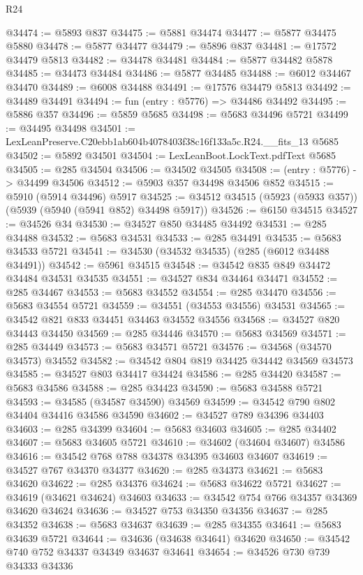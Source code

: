 \begin{lexlean}{R24}
\begin{coremodule}
@34474 := @5893 @837
@34475 := @5881 @34474
@34477 := @5877 @34475 @5880
@34478 := @5877 @34477
@34479 := @5896 @837
@34481 := @17572 @34479 @5813
@34482 := @34478 @34481
@34484 := @5877 @34482 @5878
@34485 := @34473 @34484
@34486 := @5877 @34485
@34488 := @6012 @34467 @34470
@34489 := @6008 @34488
@34491 := @17576 @34479 @5813
@34492 := @34489 @34491
@34494 := fun (entry : @5776) => @34486 @34492
@34495 := @5886 @357
@34496 := @5859 @5685
@34498 := @5683 @34496 @5721
@34499 := @34495 @34498
@34501 := LexLeanPreserve.C20ebb1ab604b4078403f38c16f133a5c.R24.__fits_13 @5685
@34502 := @5892 @34501
@34504 := LexLeanBoot.LockText.pdfText @5685
@34505 := @285 @34504
@34506 := @34502 @34505
@34508 := (entry : @5776) -> @34499 @34506
@34512 := @5903 @357 @34498 @34506 @852
@34515 := @5910 (@5914 @34496) @5917
@34525 := @34512 @34515 (@5923 (@5933 @357)) (@5939 (@5940 (@5941 @852) @34498 @5917))
@34526 := @6150 @34515
@34527 := @34526 @34
@34530 := @34527 @850 @34485 @34492
@34531 := @285 @34488
@34532 := @5683 @34531
@34533 := @285 @34491
@34535 := @5683 @34533 @5721
@34541 := @34530 (@34532 @34535) (@285 (@6012 @34488 @34491))
@34542 := @5961 @34515
@34548 := @34542 @835 @849 @34472 @34484 @34531 @34535
@34551 := @34527 @834 @34464 @34471
@34552 := @285 @34467
@34553 := @5683 @34552
@34554 := @285 @34470
@34556 := @5683 @34554 @5721
@34559 := @34551 (@34553 @34556) @34531
@34565 := @34542 @821 @833 @34451 @34463 @34552 @34556
@34568 := @34527 @820 @34443 @34450
@34569 := @285 @34446
@34570 := @5683 @34569
@34571 := @285 @34449
@34573 := @5683 @34571 @5721
@34576 := @34568 (@34570 @34573) @34552
@34582 := @34542 @804 @819 @34425 @34442 @34569 @34573
@34585 := @34527 @803 @34417 @34424
@34586 := @285 @34420
@34587 := @5683 @34586
@34588 := @285 @34423
@34590 := @5683 @34588 @5721
@34593 := @34585 (@34587 @34590) @34569
@34599 := @34542 @790 @802 @34404 @34416 @34586 @34590
@34602 := @34527 @789 @34396 @34403
@34603 := @285 @34399
@34604 := @5683 @34603
@34605 := @285 @34402
@34607 := @5683 @34605 @5721
@34610 := @34602 (@34604 @34607) @34586
@34616 := @34542 @768 @788 @34378 @34395 @34603 @34607
@34619 := @34527 @767 @34370 @34377
@34620 := @285 @34373
@34621 := @5683 @34620
@34622 := @285 @34376
@34624 := @5683 @34622 @5721
@34627 := @34619 (@34621 @34624) @34603
@34633 := @34542 @754 @766 @34357 @34369 @34620 @34624
@34636 := @34527 @753 @34350 @34356
@34637 := @285 @34352
@34638 := @5683 @34637
@34639 := @285 @34355
@34641 := @5683 @34639 @5721
@34644 := @34636 (@34638 @34641) @34620
@34650 := @34542 @740 @752 @34337 @34349 @34637 @34641
@34654 := @34526 @730 @739 @34333 @34336

\end{coremodule}
\end{lexlean}
